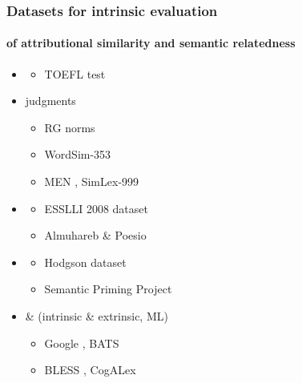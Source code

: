 \documentclass[t]{beamer} %
\begin{document}
\begin{frame}
  \frametitle{Datasets for intrinsic evaluation}
  \framesubtitle{of attributional similarity and semantic relatedness}
  
  \ungap[1]
  \begin{itemize}
  \item<1-> 
    \begin{itemize}
    \item TOEFL test \citep{Landauer:Dumais:97}
    \end{itemize}
  \item<2->  judgments
    \begin{itemize}
    \item RG norms \citep{Rubenstein:Goodenough:65}
    \item WordSim-353 \citep{Finkelstein:etc:02}
    \item MEN \citep{Bruni:Tran:Baroni:14}, SimLex-999 \citep{Hill:Reichart:Korhonen:15}
    \end{itemize}
  \item<3-> 
    \begin{itemize}
    \item ESSLLI 2008 dataset
    \item Almuhareb \& Poesio \citep[AP,][]{Almuhareb:06}
    \end{itemize}
  \item<4-> 
    \begin{itemize}
    \item Hodgson dataset \citep{Pado:Lapata:07}
    \item Semantic Priming Project \citep{Hutchinson:etc:13}
    \end{itemize}
  \item<5->  \&  (intrinsic \& extrinsic, ML)
    \begin{itemize}\small
    \item Google \citep{Mikolov:etc:13}, BATS \citep{Gladkova:Drozd:Matsuoka:16}
    \item BLESS \citep{Baroni:Lenci:11}, CogALex \citep{Santus:etc:16}
    \end{itemize}
  \end{itemize}
\end{frame}
\end{document}
